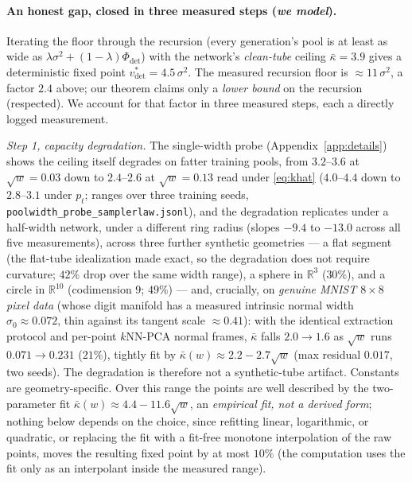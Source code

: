 \documentclass[11pt]{article}
\theoremstyle{remark}
\newcommand{\kb}{\bar\kappa}
\newcommand{\R}{\mathbb{R}}
\newcommand{\Phidet}{\Phi_{\mathrm{det}}}
\newcommand{\sigsq}{\sigma^2}
\begin{document}
\paragraph{An honest gap, closed in three measured steps (\emph{we model}).} Iterating
the floor through the recursion (every generation's pool is at least as wide as
$\lambda\sigsq+(1-\lambda)\Phidet$) with the network's \emph{clean-tube} ceiling
$\kb=3.9$ gives a deterministic fixed point $v^*_{\mathrm{det}}=4.5\,\sigsq$. The
measured recursion floor is $\approx11\,\sigsq$, a factor $2.4$ above; our theorem
claims only a \emph{lower bound} on the recursion (respected). We account for that
factor in three measured steps, each a directly logged measurement.

\emph{Step 1, capacity degradation.} The single-width probe
(Appendix~\ref{app:details}) shows the ceiling itself degrades on fatter training pools,
from $3.2$--$3.6$ at $\sqrt w=0.03$ down to $2.4$--$2.6$ at $\sqrt w=0.13$ read under
\eqref{eq:khat} ($4.0$--$4.4$ down to $2.8$--$3.1$ under $p_t$; ranges over three training
seeds, \texttt{poolwidth\_probe\_samplerlaw.jsonl}), and the degradation replicates under a
half-width network, under a
different ring radius (slopes $-9.4$ to $-13.0$ across all five measurements), across
three further synthetic geometries --- a flat segment (the flat-tube idealization made
exact, so the degradation does not require curvature; $42\%$ drop over the same width
range), a sphere in $\R^3$ ($30\%$), and a circle in $\R^{10}$ (codimension 9; $49\%$)
--- and, crucially, on \emph{genuine MNIST $8\times8$ pixel data} (whose digit manifold
has a measured intrinsic normal width $\sigma_0\approx0.072$, thin against its tangent
scale $\approx0.41$): with the identical extraction protocol and per-point $k$NN-PCA
normal frames, $\kb$ falls $2.0\to1.6$ as $\sqrt w$ runs $0.071\to0.231$ ($21\%$),
tightly fit by $\kb(w)\approx2.2-2.7\sqrt w$ (max residual $0.017$, two seeds). The
degradation is therefore not a synthetic-tube artifact. Constants are
geometry-specific. Over this range the points are well described by the
two-parameter fit $\kb(w)\approx4.4-11.6\sqrt{w}$, an \emph{empirical fit, not a derived
form}; nothing below depends on the choice, since refitting linear, logarithmic, or
quadratic, or replacing the fit with a fit-free monotone interpolation of the raw points,
moves the resulting fixed point by at most $10\%$ (the computation uses the fit only as an
interpolant inside the measured range).
\end{document}
